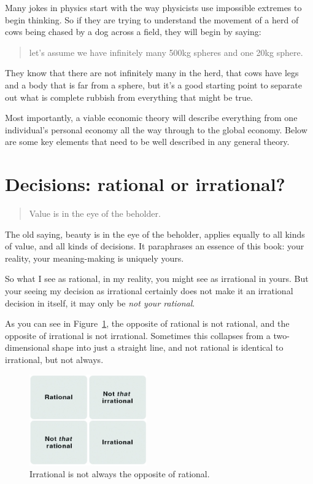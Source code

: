 Many jokes in physics start with the way physicists  use impossible extremes to begin thinking. So if they are trying to understand the movement of a herd of cows being chased by a dog across a field, they will begin by saying: 
\begin{quote}
let's assume we have infinitely many 500kg spheres and one 20kg sphere.
\end{quote} 
They know that there are not infinitely many in the herd, that cows have legs and a body that is far from a sphere, but it's a good starting point to separate out what is complete rubbish from everything that might be true. 


Most importantly, a viable economic theory   will describe everything from one individual's personal economy all the way through to the global economy. Below are some key elements that need to be well described in any general theory.
\section{Decisions: rational or irrational?}
\begin{quotation}
Value is in the eye of the beholder. 
\end{quotation}


The old saying, beauty is in the eye of the beholder, applies equally to all kinds of value, and all kinds of decisions. It paraphrases an essence of this book: your reality, your meaning\hyp{}making is uniquely yours.


So what I see as rational, in my reality, you might see as irrational in yours. But your seeing my decision as irrational certainly does not make it an irrational decision in itself, it may only be \emph{not your rational}.


As you can see in Figure~\ref{table:rational-irrational}, the opposite of rational is not rational, and the opposite of irrational is not irrational. Sometimes this collapses from a two\hyp{}dimensional shape into just a straight line, and not rational is identical to irrational, but not always.


\begin{figure}
\includegraphics[width=0.45\textwidth]{./Images/Table-6.1}
\caption{Irrational is not always the opposite of rational.}
\label{table:rational-irrational}
\end{figure}


